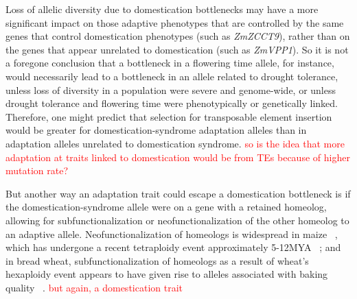 \documentclass[12pt]{article}
\newcommand{\mbh}[1]{\textcolor{red}{\normalsize  #1}}
\begin{document}
Loss of allelic diversity due to domestication bottlenecks may have a more significant impact on those adaptive phenotypes that are controlled by the same genes that control domestication phenotypes (such as \textit{ZmZCCT9}), rather than on the genes that appear unrelated to domestication (such as \textit{ZmVPP1}).
So it is not a foregone conclusion that a bottleneck in a flowering time allele, for instance, would necessarily lead to a bottleneck in an allele related to drought tolerance, unless loss of diversity in a population were severe and genome-wide, or unless drought tolerance and flowering time were phenotypically or genetically linked.
Therefore, one might predict that selection for transposable element insertion would be greater for domestication-syndrome adaptation alleles than in adaptation alleles unrelated to domestication syndrome. \mbh{so is the idea that more adaptation at traits linked to domestication would be from TEs because of higher mutation rate?} 

But another way an adaptation trait could escape a domestication bottleneck is if the domestication-syndrome allele were on a gene with a retained homeolog, allowing for subfunctionalization or neofunctionalization of the other homeolog to an adaptive allele.
Neofunctionalization of homeologs is widespread in maize ~\citep{Hughes2014}, which has undergone a recent tetraploidy event approximately 5-12MYA ~\citep{Swigonova2004}; and in bread wheat, subfunctionalization of homeologs as a result of  wheat's hexaploidy event appears to have given rise to alleles associated with baking quality ~\citep{Pfeifer2014}. \mbh{but again, a domestication trait}
\end{document}
